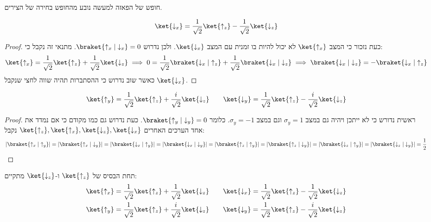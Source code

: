 \documentclass{tstextbook}
\begin{document}
\begin{remark}
חופש של הפאזה למעשה נובע מהחופש בחירה של הצירים.

\end{remark}
\begin{proposition}
$$\ket{\downarrow_{x}} = \frac{1}{\sqrt{ 2 }}\ket{\uparrow_{z}} -\frac{1}{\sqrt{ 2 }}\ket{\downarrow_{z}} $$

\end{proposition}
\begin{proof}
כעת נזכור כי המצב \(\ket{\uparrow_{x}}\) לא יכול להיות בו זמנית עם המצב \(\ket{\downarrow_{x}}\). ולכן נדרוש \(\braket{ \uparrow_{x} | \downarrow_{x} }=0\). מתנאי זה נקבל כי:
$$\ket{\uparrow_{x}} = \frac{1}{\sqrt{ 2 }}\ket{\uparrow_{z}} +\frac{1}{\sqrt{ 2 }}\ket{\downarrow_{z}} \implies 0 = \frac{1}{\sqrt{ 2 }}\braket{ \downarrow_{x} |\uparrow_{z}  }+\frac{1}{\sqrt{ 2 }}\braket{ \downarrow_{x} | \downarrow_{z} }\implies   \braket{ \downarrow_{x} | \downarrow_{z} } = - \braket{ \downarrow_{x} | \uparrow_{z} }$$
כאשר שוב נדרוש כי ההסתברות תהיה שווה לחצי שנקבל \(\ket{\downarrow_{x}}\). 

\end{proof}
\begin{proposition}
$$
\ket{\uparrow_{y}} = \frac{1}{\sqrt{ 2 }}\ket{\uparrow_{z}} +\frac{i}{\sqrt{ 2 }}\ket{\downarrow_{z}} \qquad \ket{\downarrow_{y}} = \frac{1}{\sqrt{ 2 }}\ket{\uparrow_{z}} -\frac{i}{\sqrt{ 2 }}\ket{\downarrow_{z}} $$

\end{proposition}
\begin{proof}
ראשית נדורש כי לא ייתכן ויהיה גם במצב \(\sigma_{y}=1\) וגם במצב \(\sigma_{y}=-1\). כלומר \(\braket{ \uparrow_{y} | \downarrow_{y} }=0\).
כעת נדרוש גם כמו מקודם כי אם נמדד את אחד הערכים האחרים \(\ket{\uparrow_{z}},\ket{\uparrow_{x}},\ket{\downarrow_{z}},\ket{\downarrow_{x}}\) נקבל:
$$\left\lvert  \braket{ \uparrow_{x} | \uparrow_{y} }   \right\rvert =\left\lvert  \braket{ \uparrow_{x} | \downarrow_{y} }   \right\rvert =\left\lvert  \braket{ \downarrow_{x} | \uparrow_{y} }   \right\rvert =\left\lvert  \braket{ \downarrow_{x} | \downarrow_{y} }   \right\rvert =\left\lvert  \braket{ \uparrow_{z} | \uparrow_{y} }   \right\rvert =\left\lvert  \braket{ \uparrow_{z} | \downarrow_{y} }   \right\rvert =\left\lvert  \braket{ \downarrow_{z} | \uparrow_{y} }   \right\rvert =\left\lvert  \braket{ \downarrow_{z} | \downarrow_{y} }   \right\rvert=\frac{1}{2}$$

\end{proof}
\begin{corollary}
תחת הבסיס של \(\ket{\uparrow_{z}}\) ו-\(\ket{\downarrow_{z}}\) מתקיים:
\begin{gather*}\ket{\uparrow_{x}} = \frac{1}{\sqrt{ 2 }}\ket{\uparrow_{z}} +\frac{1}{\sqrt{ 2 }}\ket{\downarrow_{z}}  \qquad \ket{\downarrow_{x}} = \frac{1}{\sqrt{ 2 }}\ket{\uparrow_{z}} -\frac{1}{\sqrt{ 2 }}\ket{\downarrow_{z}}  \\\ket{\uparrow_{y}} = \frac{1}{\sqrt{ 2 }}\ket{\uparrow_{z}} +\frac{i}{\sqrt{ 2 }}\ket{\downarrow_{z}} \qquad \ket{\downarrow_{y}} = \frac{1}{\sqrt{ 2 }}\ket{\uparrow_{z}} -\frac{i}{\sqrt{ 2 }}\ket{\downarrow_{z}} 
\end{gather*}

\end{corollary}
\end{document}
